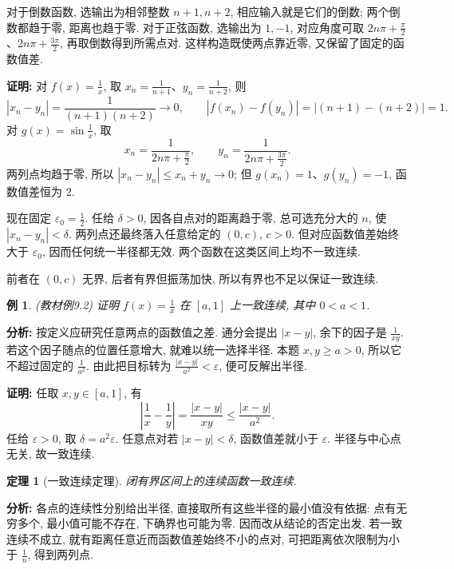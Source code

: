 \documentclass[UTF8,openany]{ctexbook}
\theoremstyle{chinesetextbook}
\newtheorem{example}{例}[section]
\newtheorem{theorem}{定理}[section]
\newenvironment{cnproof}{\par\indent\textbf{证明:} \ignorespaces}{\par}
\begin{document}
对于倒数函数, 选输出为相邻整数 $n+1,n+2$, 相应输入就是它们的倒数; 两个倒数都趋于零, 距离也趋于零. 对于正弦函数, 选输出为 $1,-1$, 对应角度可取 $\displaystyle2n\pi+\frac\pi2$、$\displaystyle2n\pi+\frac{3\pi}2$, 再取倒数得到所需点对. 这样构造既使两点靠近零, 又保留了固定的函数值差.
\begin{cnproof}
对 $\displaystyle f(x)=\frac1x$, 取 $\displaystyle x_n=\frac1{n+1}$、$\displaystyle y_n=\frac1{n+2}$, 则
\[
|x_n-y_n|=\frac1{(n+1)(n+2)}\to0,\qquad
|f(x_n)-f(y_n)|=|(n+1)-(n+2)|=1.
\]
对 $\displaystyle g(x)=\sin\frac1x$, 取
\[
x_n=\frac1{2n\pi+\frac\pi2},\qquad
 y_n=\frac1{2n\pi+\frac{3\pi}2}.
\]
两列点均趋于零, 所以 $|x_n-y_n|\le x_n+y_n\to0$; 但 $g(x_n)=1$、$g(y_n)=-1$, 函数值差恒为 $2$.

现在固定 $\displaystyle\varepsilon_0=\frac12$. 任给 $\delta>0$, 因各自点对的距离趋于零, 总可选充分大的 $n$, 使 $|x_n-y_n|<\delta$. 两列点还最终落入任意给定的 $(0,c)$, $c>0$. 但对应函数值差始终大于 $\varepsilon_0$, 因而任何统一半径都无效. 两个函数在这类区间上均不一致连续.

前者在 $(0,c)$ 无界, 后者有界但振荡加快, 所以有界也不足以保证一致连续.
\end{cnproof}
\begin{example}
(教材例9.2) 证明 $\displaystyle f(x)=\frac1x$ 在 $[a,1]$ 上一致连续, 其中 $0<a<1$.
\end{example}
\par\indent\textbf{分析:} 按定义应研究任意两点的函数值之差. 通分会提出 $|x-y|$, 余下的因子是 $\displaystyle\frac1{xy}$. 若这个因子随点的位置任意增大, 就难以统一选择半径. 本题 $x,y\ge a>0$, 所以它不超过固定的 $\displaystyle\frac1{a^2}$. 由此把目标转为 $\displaystyle\frac{|x-y|}{a^2}<\varepsilon$, 便可反解出半径.
\begin{cnproof}
任取 $x,y\in[a,1]$, 有
\[
\left|\frac1x-\frac1y\right|=\frac{|x-y|}{xy}\le\frac{|x-y|}{a^2}.
\]
任给 $\varepsilon>0$, 取 $\delta=a^2\varepsilon$. 任意点对若 $|x-y|<\delta$, 函数值差就小于 $\varepsilon$. 半径与中心点无关, 故一致连续.
\end{cnproof}
\begin{theorem}[一致连续定理]
闭有界区间上的连续函数一致连续.
\end{theorem}
\par\indent\textbf{分析:} 各点的连续性分别给出半径, 直接取所有这些半径的最小值没有依据: 点有无穷多个, 最小值可能不存在, 下确界也可能为零. 因而改从结论的否定出发. 若一致连续不成立, 就有距离任意近而函数值差始终不小的点对, 可把距离依次限制为小于 $\displaystyle\frac1n$, 得到两列点.
\end{document}

